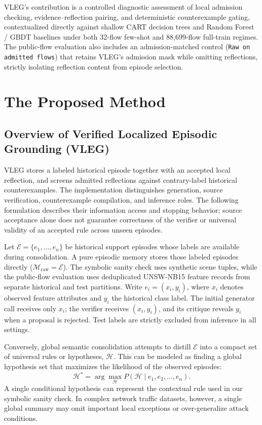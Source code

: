 \documentclass[10pt,a4paper,onecolumn]{article}
\theoremstyle{definition}
\theoremstyle{remark}
\begin{document}
VLEG's contribution is a controlled diagnostic assessment of local admission checking, evidence--reflection pairing, and deterministic counterexample gating, contextualized directly against shallow CART decision trees and Random Forest / GBDT baselines under both 32-flow few-shot and 88,699-flow full-train regimes. The public-flow evaluation also includes an admission-matched control (\texttt{Raw on admitted flows}) that retains VLEG's admission mask while omitting reflections, strictly isolating reflection content from episode selection.

\section{The Proposed Method}
\label{sec:vleg-methodology}
\subsection{Overview of Verified Localized Episodic Grounding (VLEG)}
VLEG stores a labeled historical episode together with an accepted local reflection, and screens admitted reflections against contrary-label historical counterexamples. The implementation distinguishes generation, source verification, counterexample compilation, and inference roles. The following formulation describes their information access and stopping behavior; source acceptance alone does not guarantee correctness of the verifier or universal validity of an accepted rule across unseen episodes.

Let $\mathcal{E}=\{e_1,\ldots,e_n\}$ be historical support episodes whose labels are available during consolidation. A pure episodic memory stores those labeled episodes directly ($\mathcal{M}_{\mathrm{raw}} = \mathcal{E}$). The symbolic sanity check uses synthetic scene tuples, while the public-flow evaluation uses deduplicated UNSW-NB15 feature records from separate historical and test partitions. Write $e_i=(x_i,y_i)$, where $x_i$ denotes observed feature attributes and $y_i$ the historical class label. The initial generator call receives only $x_i$; the verifier receives $(x_i,y_i)$, and its critique reveals $y_i$ when a proposal is rejected. Test labels are strictly excluded from inference in all settings.

Conversely, global semantic consolidation \cite{agarwal2026hypothesis} attempts to distill $\mathcal{E}$ into a compact set of universal rules or hypotheses, $\mathcal{H}$. This can be modeled as finding a global hypothesis set that maximizes the likelihood of the observed episodes:
\begin{equation}
    \mathcal{H}^* = \arg\max_{\mathcal{H}} P(\mathcal{H} \mid e_1, e_2, \dots, e_n).
    \label{eq:global_h}
\end{equation}
A single conditional hypothesis can represent the contextual rule used in our symbolic sanity check. In complex network traffic datasets, however, a single global summary may omit important local exceptions or over-generalize attack conditions.
\end{document}
